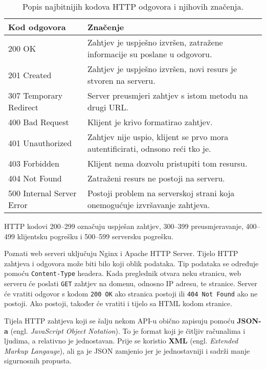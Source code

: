 \begin{table}[]
    \begin{tabular}{|l|l|}
        \hline
        \textbf{Kod odgovora}     & \textbf{Značenje}                                                              \\ \hline
        200 OK                    & Zahtjev je uspješno izvršen, zatražene informacije su poslane u odgovoru.      \\ \hline
        201 Created               & Zahtjev je uspješno izvršen, novi resurs je stvoren na serveru.                \\ \hline
        307 Temporary Redirect    & Server preusmjeri zahtjev s istom metodu na drugi URL.                         \\ \hline
        400 Bad Request           & Klijent je krivo formatirao zahtjev.                                           \\ \hline
        401 Unauthorized          & Zahtjev nije uspio, klijent se prvo mora autentificirati, odnsono reći tko je. \\ \hline
        403 Forbidden             & Klijent nema dozvolu pristupiti tom resursu.                                   \\ \hline
        404 Not Found             & Zatraženi resurs ne postoji na serveru.                                        \\ \hline
        500 Internal Server Error & Postoji problem na serverskoj strani koja onemogućuje izvršavanje zahtjeva.    \\ \hline
    \end{tabular}
    \caption{Popis najbitnijih kodova HTTP odgovora i njihovih značenja.}
    \label{tab:http-kodovi}
\end{table}

HTTP kodovi 200--299 označuju uspješan zahtjev, 300--399 preusmjeravanje, 400--499 klijentsku pogrešku i 500--599 serversku pogrešku.

Poznati web serveri uključuju Nginx i Apache HTTP Server.
Tijelo HTTP zahtjeva i odgovora može biti bilo koji oblik podataka.
Tip podataka se određuje pomoću \verb|Content-Type| headera.
Kada preglednik otvara neku stranicu, web serveru će poslati \verb|GET| zahtjev na domenu, odnosno IP adresu, te stranice.
Server će vratiti odgovor s kodom \verb|200 OK| ako stranica postoji ili \verb|404 Not Found| ako ne postoji.
Ako postoji, također će vratiti i tijelo sa HTML kodom stranice.

Tijela HTTP zahtjeva koji se šalju nekom API-u obično zapisuju pomoću \textbf{JSON-a} (engl. \textit{JavaScript Object Notation}).
To je format koji je čitljiv računalima i ljudima, a relativno je jednostavan.
Prije se koristio \textbf{XML} (engl. \textit{Extended Markup Langauge}), ali ga je JSON zamjenio jer je jednostavniji i sadrži manje sigurnosnih propusta.

